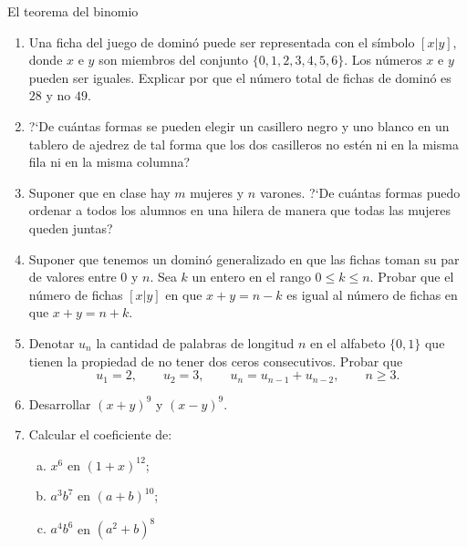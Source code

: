 \begin{section}{El teorema del binomio}
\begin{enumerate}[1)]
\item Una ficha del juego de dominó puede ser representada con el símbolo $[x|y]$,
donde $x$ e $y$ son miembros del conjunto $\{0,1,2,3,4,5,6\}$. Los números $x$
e $y$ pueden ser iguales. Explicar por que el número total de fichas de dominó
es $28$ y no $49$.

\item ?`De cuántas formas se pueden elegir un casillero negro y uno blanco en
un tablero de ajedrez de tal forma que los dos casilleros no estén ni en la misma
fila ni en la misma columna?

\item Suponer que en clase hay $m$ mujeres y $n$ varones. ?`De cuántas formas
puedo ordenar a todos los alumnos en una hilera de manera que todas las mujeres
queden juntas?

\item Suponer que tenemos un dominó generalizado en que las fichas toman su
par de valores entre $0$ y $n$. Sea $k$ un entero en el rango $0\le k \le n$.
Probar que el número de fichas $[x|y]$ en que $x+y = n-k$ es igual al número de
fichas en que  $x+y = n+k$.

\item Denotar $u_n$ la cantidad de palabras de longitud $n$ en el alfabeto
$\{0,1\}$ que tienen la propiedad de no tener dos ceros consecutivos. Probar que
$$
u_1=2,\qquad u_2=3,\qquad u_n =u_{n-1} +u_{n-2},\qquad n \ge 3.
$$

\item Desarrollar $(x+y)^9$ y $(x-y)^9$.

\item Calcular el coeficiente de:
\begin{multicols}{3}
\begin{enumerate}[a)]
	\item $x^6$ en $(1+x)^{12}$;
	
	\item $a^3b^7$ en $(a+b)^{10}$;
	
	\item $a^4b^6$ en $(a^2+b)^8$
\end{enumerate}
\end{multicols}


\end{enumerate}
\end{section}
